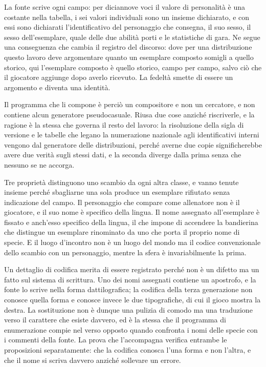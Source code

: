 La fonte scrive ogni campo: per diciannove voci il valore di personalità è una costante nella tabella, i sei valori individuali sono un insieme dichiarato, e con essi sono dichiarati l'identificativo del personaggio che consegna, il suo sesso, il sesso dell'esemplare, quale delle due abilità porti e le statistiche di gara. Ne segue una conseguenza che cambia il registro del discorso: dove per una distribuzione questo lavoro deve argomentare quanto un esemplare composto somigli a quello storico, qui l'esemplare composto è quello storico, campo per campo, salvo ciò che il giocatore aggiunge dopo averlo ricevuto. La fedeltà smette di essere un argomento e diventa una identità.

Il programma che li compone è perciò un compositore e non un cercatore, e non contiene alcun generatore pseudocasuale. Riusa due cose anziché riscriverle, e la ragione è la stessa che governa il resto del lavoro: la risoluzione della sigla di versione e le tabelle che legano la numerazione nazionale agli identificativi interni vengono dal generatore delle distribuzioni, perché averne due copie significherebbe avere due verità sugli stessi dati, e la seconda diverge dalla prima senza che nessuno se ne accorga.

Tre proprietà distinguono uno scambio da ogni altra classe, e vanno tenute insieme perché sbagliarne una sola produce un esemplare rifiutato senza indicazione del campo. Il personaggio che compare come allenatore non è il giocatore, e il suo nome è specifico della lingua. Il nome assegnato all'esemplare è fissato e anch'esso specifico della lingua, il che impone di accendere la bandierina che distingue un esemplare rinominato da uno che porta il proprio nome di specie. E il luogo d'incontro non è un luogo del mondo ma il codice convenzionale dello scambio con un personaggio, mentre la sfera è invariabilmente la prima.

Un dettaglio di codifica merita di essere registrato perché non è un difetto ma un fatto sul sistema di scrittura. Uno dei nomi assegnati contiene un apostrofo, e la fonte lo scrive nella forma dattilografica; la codifica della terza generazione non conosce quella forma e conosce invece le due tipografiche, di cui il gioco mostra la destra. La sostituzione non è dunque una pulizia di comodo ma una traduzione verso il carattere che esiste davvero, ed è la stessa che il programma di enumerazione compie nel verso opposto quando confronta i nomi delle specie con i commenti della fonte. La prova che l'accompagna verifica entrambe le proposizioni separatamente: che la codifica conosca l'una forma e non l'altra, e che il nome si scriva davvero anziché sollevare un errore.

